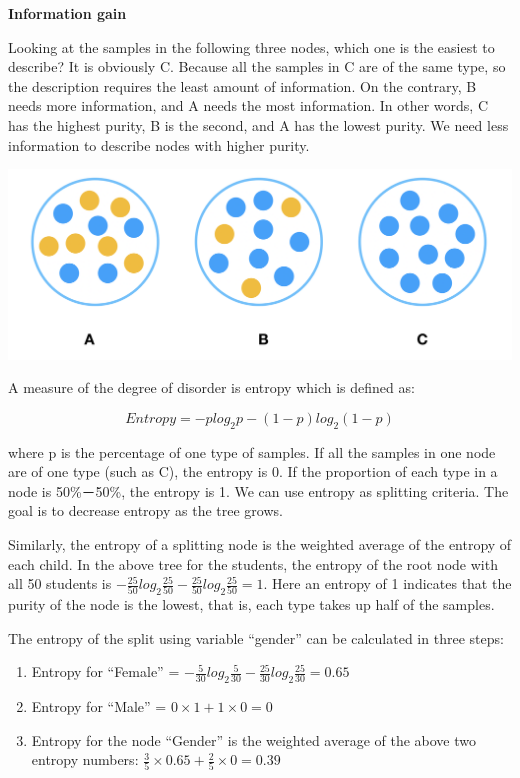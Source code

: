 \documentclass[12pt,]{krantz}
\providecommand{\tightlist}{%
  \setlength{\itemsep}{0pt}\setlength{\parskip}{0pt}}
\begin{document}
\textbf{Information gain}

Looking at the samples in the following three nodes, which one is the easiest to describe? It is obviously C. Because all the samples in C are of the same type, so the description requires the least amount of information. On the contrary, B needs more information, and A needs the most information. In other words, C has the highest purity, B is the second, and A has the lowest purity. We need less information to describe nodes with higher purity.

\includegraphics{images/InfoGainEN.PNG}

A measure of the degree of disorder is entropy which is defined as:

\[Entropy=-plog_{2}p-(1-p)log_{2}(1-p)\]

where p is the percentage of one type of samples. If all the samples in one node are of one type (such as C), the entropy is 0. If the proportion of each type in a node is 50\%－50\%, the entropy is 1. We can use entropy as splitting criteria. The goal is to decrease entropy as the tree grows.

Similarly, the entropy of a splitting node is the weighted average of the entropy of each child. In the above tree for the students, the entropy of the root node with all 50 students is \(-\frac{25}{50}log_{2}\frac{25}{50}-\frac{25}{50}log_{2}\frac{25}{50}=1\). Here an entropy of 1 indicates that the purity of the node is the lowest, that is, each type takes up half of the samples.

The entropy of the split using variable ``gender'' can be calculated in three steps:

\begin{enumerate}
\def\labelenumi{\arabic{enumi}.}
\tightlist
\item
  Entropy for ``Female'' = \(-\frac{5}{30}log_{2}\frac{5}{30}-\frac{25}{30}log_{2}\frac{25}{30}=0.65\)
\item
  Entropy for ``Male'' = \(0\times1+1\times 0=0\)
\item
  Entropy for the node ``Gender'' is the weighted average of the above two entropy numbers: \(\frac{3}{5}\times 0.65+\frac{2}{5}\times 0=0.39\)
\end{enumerate}
\end{document}

